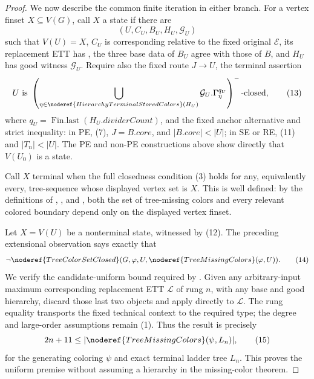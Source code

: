 \begin{proof}
We now describe the common finite iteration in either branch.  For a vertex
finset \(X\subseteq V(G)\), call \(X\) a state if there are
\[
 (U,C_U,B_U,H_U,\mathcal G_U)                                   \tag{12}
\]
such that \(V(U)=X\), \(C_U\) is corresponding relative to the fixed
original \(\mathcal E\), its replacement ETT has
, the
three base data of \(B_U\) agree with those of \(B\), and \(H_U\) has good
witness \(\mathcal G_U\).  Require also the fixed route
\(J\longrightarrow U\), the terminal
 assertion
\[
 U\text{ is }
 \left(\bigcup_{\eta\in
   \noderef{HierarchyTerminalStoredColors}(H_U)}
   \mathcal G_U.\Gamma^{q_U}_\eta\right)^-
 \text{-closed},                                                \tag{13}
\]
where \(q_U=\operatorname{Fin.last}(H_U.\mathit{dividerCount})\),
and the fixed anchor alternative and strict inequality: in PE, (7),
\(J=B.\mathit{core}\), and
\(|B.\mathit{core}|<|U|\); in SE or RE, (11) and
\(|T_n|<|U|\).  The PE and non-PE constructions above show directly that
\(V(U_0)\) is a state.

Call \(X\) terminal when the full closedness condition (3) holds for any,
equivalently every, tree-sequence whose displayed vertex set is \(X\).
This is well defined: by the definitions of
, , and
, both the set of tree-missing colors and every
relevant colored boundary depend only on the displayed vertex finset.

Let \(X=V(U)\) be a nonterminal state, witnessed by (12).  The preceding
extensional observation says exactly that
\[
 \neg\noderef{TreeColorSetClosed}
       (G,\varphi,U,\noderef{TreeMissingColors}(\varphi,U)).      \tag{14}
\]
We verify the candidate-uniform bound required by
.  Given any arbitrary-input
maximum corresponding replacement ETT \(\mathcal L\) of rung \(n\), with
any base and good hierarchy, discard those last two objects and apply
 directly to
\(\mathcal L\).  The rung equality transports the fixed technical context
to the required type; the degree and large-order assumptions remain (1).
Thus the result is precisely
\[
            2n+11\leq
            |\noderef{TreeMissingColors}(\psi,L_n)|,             \tag{15}
\]
for the generating coloring \(\psi\) and exact terminal ladder tree
\(L_n\).  This proves the uniform premise without assuming a hierarchy in
the missing-color theorem.


\end{proof}
